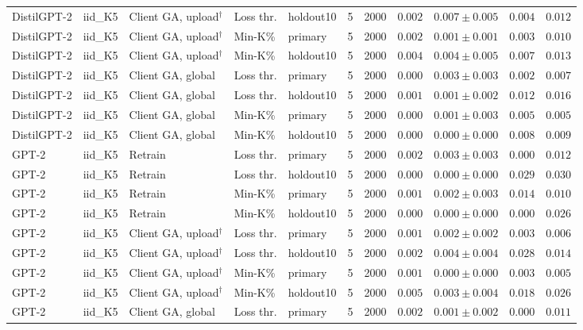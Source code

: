 {\begin{longtable}{@{\extracolsep{\fill}}lllllcccccc@{}}
DistilGPT-2 & iid\_K5 & Client GA, upload$^{\dagger}$ & Loss thr. & holdout10 & 5 & 2000 & $0.002$ & $0.007 \pm 0.005$ & $0.004$ & $0.012$ \\
DistilGPT-2 & iid\_K5 & Client GA, upload$^{\dagger}$ & Min-K\% & primary & 5 & 2000 & $0.002$ & $0.001 \pm 0.001$ & $0.003$ & $0.010$ \\
DistilGPT-2 & iid\_K5 & Client GA, upload$^{\dagger}$ & Min-K\% & holdout10 & 5 & 2000 & $0.004$ & $0.004 \pm 0.005$ & $0.007$ & $0.013$ \\
DistilGPT-2 & iid\_K5 & Client GA, global & Loss thr. & primary & 5 & 2000 & $0.000$ & $0.003 \pm 0.003$ & $0.002$ & $0.007$ \\
DistilGPT-2 & iid\_K5 & Client GA, global & Loss thr. & holdout10 & 5 & 2000 & $0.001$ & $0.001 \pm 0.002$ & $0.012$ & $0.016$ \\
DistilGPT-2 & iid\_K5 & Client GA, global & Min-K\% & primary & 5 & 2000 & $0.000$ & $0.001 \pm 0.003$ & $0.005$ & $0.005$ \\
DistilGPT-2 & iid\_K5 & Client GA, global & Min-K\% & holdout10 & 5 & 2000 & $0.000$ & $0.000 \pm 0.000$ & $0.008$ & $0.009$ \\
GPT-2 & iid\_K5 & Retrain & Loss thr. & primary & 5 & 2000 & $0.002$ & $0.003 \pm 0.003$ & $0.000$ & $0.012$ \\
GPT-2 & iid\_K5 & Retrain & Loss thr. & holdout10 & 5 & 2000 & $0.000$ & $0.000 \pm 0.000$ & $0.029$ & $0.030$ \\
GPT-2 & iid\_K5 & Retrain & Min-K\% & primary & 5 & 2000 & $0.001$ & $0.002 \pm 0.003$ & $0.014$ & $0.010$ \\
GPT-2 & iid\_K5 & Retrain & Min-K\% & holdout10 & 5 & 2000 & $0.000$ & $0.000 \pm 0.000$ & $0.000$ & $0.026$ \\
GPT-2 & iid\_K5 & Client GA, upload$^{\dagger}$ & Loss thr. & primary & 5 & 2000 & $0.001$ & $0.002 \pm 0.002$ & $0.003$ & $0.006$ \\
GPT-2 & iid\_K5 & Client GA, upload$^{\dagger}$ & Loss thr. & holdout10 & 5 & 2000 & $0.002$ & $0.004 \pm 0.004$ & $0.028$ & $0.014$ \\
GPT-2 & iid\_K5 & Client GA, upload$^{\dagger}$ & Min-K\% & primary & 5 & 2000 & $0.001$ & $0.000 \pm 0.000$ & $0.003$ & $0.005$ \\
GPT-2 & iid\_K5 & Client GA, upload$^{\dagger}$ & Min-K\% & holdout10 & 5 & 2000 & $0.005$ & $0.003 \pm 0.004$ & $0.018$ & $0.026$ \\
GPT-2 & iid\_K5 & Client GA, global & Loss thr. & primary & 5 & 2000 & $0.002$ & $0.001 \pm 0.002$ & $0.000$ & $0.011$ \\

\end{longtable}}
